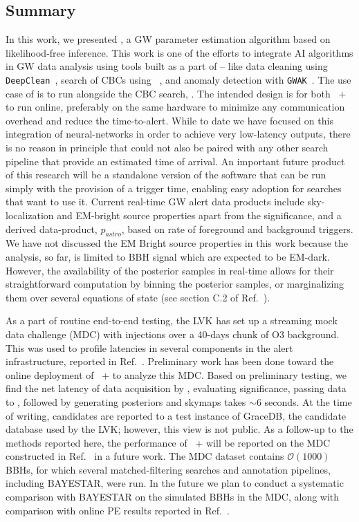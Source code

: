 \begin{refsection}
\section{Summary}\label{amp_meth_sec:conclusion}
In this work, we presented {\amplfi}, a GW parameter estimation algorithm based on likelihood-free inference.
This work is one of the efforts to integrate AI algorithms in GW data analysis using tools built as a part of {\mlgw} -- like data cleaning using {\tt{DeepClean}}~\cite{Saleem_2024}, search of CBCs using {\aframe}~\cite{aframe-methods}, and anomaly detection with {\tt GWAK}~\cite{Raikman:2023ktu}.
The use case of {\amplfi} is to run alongside the CBC search, {\aframe}.
The intended design is for both {\aframe~+~\amplfi} to run online, preferably on the same hardware to minimize any communication overhead and reduce the time-to-alert. 
While to date we have focused on this integration of neural-networks in order to achieve very low-latency outputs, there is no reason in principle that {\amplfi} could not also be paired with any other search pipeline that provide an estimated time of arrival. 
An important future product of this research will be a standalone version of the software that can be run simply with the provision of a trigger time, enabling easy adoption for searches that want to use it. 
Current real-time GW alert data products include sky-localization and EM-bright source properties apart from the significance, and a derived data-product, $p_{astro}$, based on rate of foreground and background triggers. 
We have not discussed the EM Bright source properties in this work because the analysis, so far, is limited to BBH signal which are expected to be EM-dark. 
However, the availability of the posterior samples in real-time allows for their straightforward computation by binning the posterior samples, or marginalizing them over several equations of state (see section C.2 of Ref.~\cite{Chaudhary_2024}).

As a part of routine end-to-end testing, the LVK has set up a streaming mock data challenge (MDC) with injections over a 40-days chunk of O3 background. 
This was used to profile latencies in several components in the alert infrastructure, reported in Ref.~\cite{Chaudhary_2024}. 
Preliminary work has been done toward the online deployment of {\aframe~+ \amplfi} to analyze this MDC.
Based on preliminary testing, we find the net latency of data acquisition by \aframe, evaluating significance, passing data to \amplfi, followed by generating posteriors and skymaps takes $\sim 6$ seconds. 
At the time of writing, candidates are reported to a test instance of GraceDB, the candidate database used by the LVK; however, this view is not public. 
As a follow-up to the methods reported here, the performance of {\aframe~+ \amplfi} will be reported on the MDC constructed in Ref.~\cite{Chaudhary_2024} in a future work. 
The MDC dataset contains $\mathcal{O}(1000)$ BBHs, for which several matched-filtering searches and annotation pipelines, including BAYESTAR, were run. 
In the future we plan to conduct a systematic comparison with BAYESTAR on the simulated BBHs in the MDC, along with comparison with online PE results reported in Ref.~\cite{Chaudhary_2024}.


\end{refsection}
